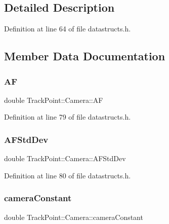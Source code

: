 \subsection{Detailed Description}


Definition at line 64 of file datastructs.\+h.



\subsection{Member Data Documentation}
\mbox{\label{struct_track_point_1_1_camera_adcc51904fb0494dad5538f1eae87b091}} 
\subsubsection{\texorpdfstring{AF}{AF}}
{\footnotesize\ttfamily double Track\+Point\+::\+Camera\+::\+AF}



Definition at line 79 of file datastructs.\+h.

\mbox{\label{struct_track_point_1_1_camera_aaf69b6a9b36b6cd211858d62c92fc30f}} 
\subsubsection{\texorpdfstring{AFStdDev}{AFStdDev}}
{\footnotesize\ttfamily double Track\+Point\+::\+Camera\+::\+A\+F\+Std\+Dev}



Definition at line 80 of file datastructs.\+h.

\mbox{\label{struct_track_point_1_1_camera_a8583ca2ade57b8d3b934ff288451dc87}} 
\subsubsection{\texorpdfstring{cameraConstant}{cameraConstant}}
{\footnotesize\ttfamily double Track\+Point\+::\+Camera\+::camera\+Constant}



